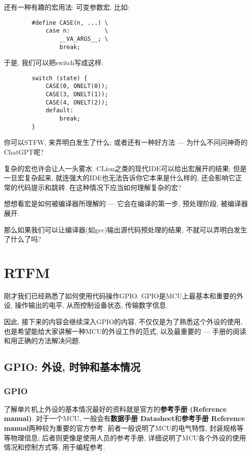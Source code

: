 \begin{definition}
	还有一种有趣的宏用法: 可变参数宏. 比如:
	\begin{lstlisting}
		#define CASE(n, ...) \
		    case n:          \
		        __VA_ARGS__; \
		        break;
	\end{lstlisting}
	于是, 我们可以把switch写成这样:
	\begin{lstlisting}
        switch (state) {
            CASE(0, ONELT(0));
            CASE(3, ONELT(1));
            CASE(4, ONELT(2));
            default:
                break;
        }
    \end{lstlisting}
	你可以STFW, 来弄明白发生了什么; 或者还有一种好方法 --- 为什么不问问神奇的ChatGPT呢?
\end{definition}
\begin{definition}
	复杂的宏也许会让人一头雾水. CLion之类的现代IDE可以给出宏展开的结果; 但是一旦宏复杂起来, 就连强大的IDE也无法告诉你它本来是什么样的, 还会影响它正常的代码提示和跳转. 在这种情况下应当如何理解复杂的宏?

	想想看宏是如何被编译器所理解的 --- 它会在编译的第一步, 预处理阶段, 被编译器展开.

	那么如果我们可以让编译器(如gcc)输出源代码预处理的结果, 不就可以弄明白发生了什么了吗?
\end{definition}

\section{RTFM}
刚才我们已经熟悉了如何使用代码操作GPIO. GPIO是MCU上最基本和重要的外设, 操作输出的电平, 从而控制设备状态, 传输数字信息.

因此, 接下来的内容会继续深入GPIO的内容, 不仅仅是为了熟悉这个外设的使用, 也是希望能给大家讲解一种MCU的外设工作的范式, 以及最重要的 --- 手册的阅读和用正确的方法解决问题.


\subsection{GPIO: 外设, 时钟和基本情况}

\subsubsection{GPIO}
了解单片机上外设的基本情况最好的资料就是官方的\textbf{参考手册 (Reference manual)}. 对于一个MCU, 一般会有\textbf{数据手册 Datasheet}和\textbf{参考手册 Reference manual}两种较为重要的官方参考. 前者一般说明了MCU的电气特性, 封装规格等等物理信息; 后者则更像是使用人员的参考手册, 详细说明了MCU各个外设的使用情况和控制方式等, 用于编程参考.

